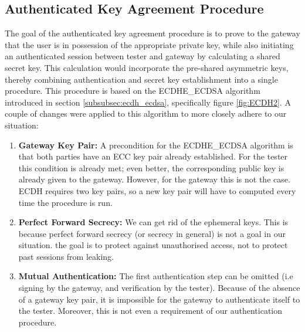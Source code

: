 \subsection{Authenticated Key Agreement Procedure}
\label{subsec:authenticated_key_agreement_procedure}

The goal of the authenticated key agreement procedure is to prove to the gateway that the user is in possession of the appropriate private key, while also initiating an authenticated session between tester and gateway by calculating a shared secret key. This calculation would incorporate the pre-shared asymmetric keys, thereby combining authentication and secret key establishment into a single procedure. This procedure is based on the ECDHE\_ECDSA algorithm introduced in section \ref{subsubsec:ecdh_ecdsa}, specifically figure \ref{fig:ECDH2}. A couple of changes were applied to this algorithm to more closely adhere to our situation:
\begin{enumerate}
	\item \textbf{Gateway Key Pair:} A precondition for the ECDHE\_ECDSA algorithm is that both parties have an ECC key pair already established. For the tester this condition is already met; even better, the corresponding public key is already given to the gateway. However, for the gateway this is not the case. ECDH requires two key pairs, so a new key pair will have to computed every time the procedure is run.
	
	\item \textbf{Perfect Forward Secrecy:} We can get rid of the ephemeral keys. This is because perfect forward secrecy (or secrecy in general) is not a goal in our situation. the goal is to protect against unauthorised access, not to protect past sessions from leaking. 
	
	\item \textbf{Mutual Authentication:} The first authentication step can be omitted (i.e signing by the gateway, and verification by the tester). Because of the absence of a gateway key pair, it is impossible for the gateway to authenticate itself to the tester. Moreover, this is not even a requirement of our authentication procedure.
\end{enumerate}
